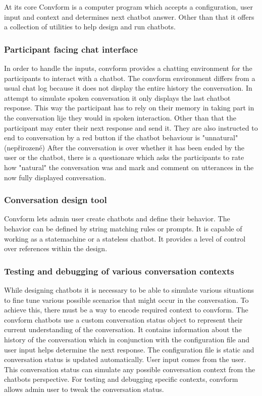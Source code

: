 \documentclass[12pt]{report}
\begin{document}
{At its core Convform is a computer program
which accepts a configuration, user input and context
and determines next chatbot answer.
Other than that it offers a collection of utilities
to help design and run chatbots.

\subsubsection{Participant facing chat interface}
In order to handle the inputs, convform provides a chatting environment
for the participants to interact with a chatbot.
The convform environment differs from a usual chat log
because it does not display
the entire history the conversation.
In attempt to simulate spoken conversation
it only displays the last chatbot response.
This way the participant has to rely on their memory
in taking part in the conversation
lije they would in spoken interaction.
Other than that the participant may enter their next response
and send it.
They are also instructed to end to conversation by a red button
if the chatbot behaviour is "unnatural" (nepřirozené)
After the conversation is over whether it has been ended by the user or the chatbot,
there is a questionare which
asks the participants to rate how "natural" the conversation was
and mark and comment on utterances in the now fully displayed conversation.

\subsubsection{Conversation design tool}
Convform lets admin user create chatbots and define their behavior.
The behavior can be defined by string matching rules or prompts.
It is capable of working as a statemachine or a stateless chatbot.
It provides a level of control over references within the design.

\subsubsection{Testing and debugging of various conversation contexts}
While designing chatbots it is necessary
to be able to simulate various situations
to fine tune various possible scenarios
that might occur in the conversation.
To achieve this, there must be a way
to encode required context to convform.
The convform chatbots use a custom conversation status object
to represent their current understanding of the conversation.
It contains information about the history of the conversation
which in conjunction with the configuration file and user input
helps determine the next response.
The configuration file is static and
conversation status is updated automatically.
User input comes from the user.
This conversation status can simulate any possible conversation context
from the chatbots perspective.
For testing and debugging specific contexts, convform allows admin user
to tweak the conversation status.

}
\end{document}
